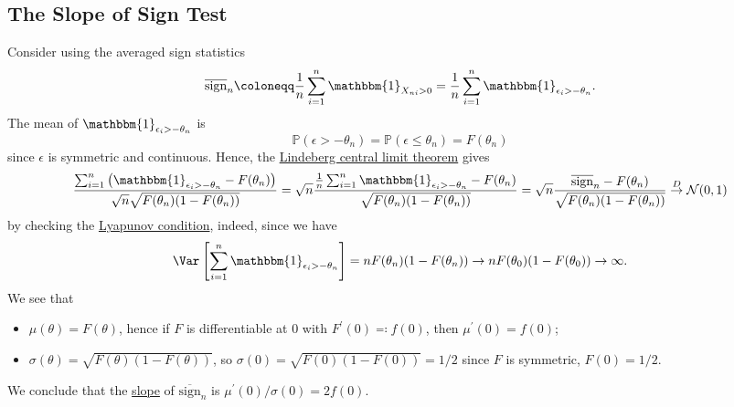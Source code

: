 \subsection{The Slope of Sign Test}
Consider using the averaged sign statistics
\[
	\overline{\mathrm{sign}} _n
	\coloneqq \frac{1}{n} \sum_{i=1}^{n} \mathbbm{1}_{X_{ni} > 0}
	= \frac{1}{n} \sum_{i=1}^{n} \mathbbm{1}_{\epsilon _i > - \theta _n}.
\]
The mean of \(\mathbbm{1}_{\epsilon _i > -\theta _n} \) is
\[
	\mathbb{P} (\epsilon > -\theta _n)
	= \mathbb{P} (\epsilon \leq \theta _n)
	= F(\theta _n)
\]
since \(\epsilon \) is symmetric and continuous. Hence, the \hyperref[thm:Lindeberg-CLT]{Lindeberg central limit theorem} gives
\[
	\frac{\sum_{i=1}^{n} \left( \mathbbm{1}_{\epsilon _i  > -\theta _n} - F(\theta _n) \right) }{\sqrt{n} \sqrt{F(\theta _n) (1 - F(\theta _n))} }
	= \sqrt{n} \frac{\frac{1}{n} \sum_{i=1}^{n} \mathbbm{1}_{\epsilon _i > -\theta _n} - F(\theta _n) }{\sqrt{F(\theta _n) (1 - F(\theta _n)) } }
	= \sqrt{n} \frac{\overline{\mathrm{sign}} _n - F(\theta _n) }{\sqrt{F(\theta _n) (1 - F(\theta _n)) } }
	\overset{D}{\to} \mathcal{N} (0, 1)
\]
by checking the \hyperref[col:Lyapunov-CLT]{Lyapunov condition}, indeed, since we have
\[
	\Var_{}\left[\sum_{i=1}^{n} \mathbbm{1}_{\epsilon _i > -\theta _n} \right]
	= n F(\theta _n) (1 - F(\theta _n))
	\to n F(\theta _0) (1 - F(\theta _0))
	\to \infty.
\]
We see that
\begin{itemize}
	\item \(\mu (\theta ) = F(\theta ) \), hence if \(F\) is differentiable at \(0\) with \(F^{\prime} (0) \eqqcolon f(0)\), then \(\mu ^{\prime} (0) = f(0)\);
	\item \(\sigma (\theta ) = \sqrt{F(\theta )(1 - F(\theta ))} \), so \(\sigma (0) = \sqrt{F(0) (1 - F(0))} = 1 / 2\) since \(F\) is symmetric, \(F(0) = 1 / 2\).
\end{itemize}
We conclude that the \hyperref[def:slope]{slope} of \(\overline{\mathrm{sign}} _n\) is \(\mu ^{\prime} (0) / \sigma (0) = 2f(0)\).

